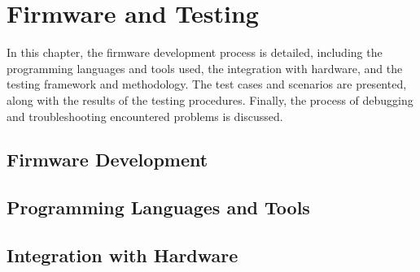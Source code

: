\chapter{Firmware and Testing}

\graphicspath{{./Figures/Modeling}}
In this chapter, the firmware development process is detailed, including the programming languages and tools used, the integration with hardware, and the testing framework and methodology.
The test cases and scenarios are presented, along with the results of the testing procedures.
Finally, the process of debugging and troubleshooting encountered problems is discussed.

\newpage

\section{Firmware Development}
\section{Programming Languages and Tools}
\section{Integration with Hardware}
